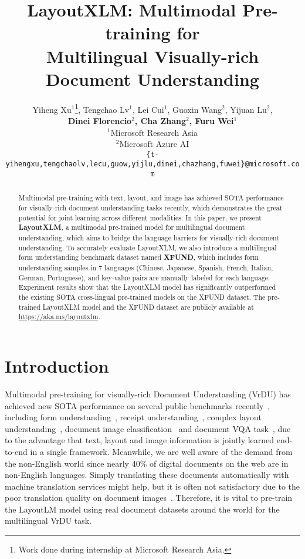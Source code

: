 \documentclass[11pt]{article}
\title{LayoutXLM: Multimodal Pre-training for \\Multilingual Visually-rich Document Understanding}
\author{Yiheng Xu$^{1}$\thanks{Work done during internship at Microsoft Research Asia.}, Tengchao Lv$^{1}$,  Lei Cui$^{1}$, Guoxin Wang$^{2}$, Yijuan Lu$^{2}$, \\ \textbf{Dinei Florencio$^{2}$, Cha Zhang$^{2}$, Furu Wei$^{1}$} \\
$^{1}$Microsoft Research Asia\\
$^{2}$Microsoft Azure AI\\
\texttt{\{t-yihengxu,tengchaolv,lecu,guow,yijlu,dinei,chazhang,fuwei\}@microsoft.com} \\
}
\newcommand{\task}{\textsc{XFUND}\xspace}
\begin{document}
\maketitle
\begin{abstract}


	Multimodal pre-training with text, layout, and image has achieved SOTA performance for visually-rich document understanding tasks recently, which demonstrates the great potential for joint learning across different modalities. In this paper, we present \textbf{LayoutXLM}, a multimodal pre-trained model for multilingual document understanding, which aims to bridge the language barriers for visually-rich document understanding. To accurately evaluate LayoutXLM, we also introduce a multilingual form understanding benchmark dataset named \textbf{\task}, which includes form understanding samples in 7 languages (Chinese, Japanese, Spanish, French, Italian, German, Portuguese), and key-value pairs are manually labeled for each language. Experiment results show that the LayoutXLM model has significantly outperformed the existing SOTA cross-lingual pre-trained models on the \task dataset. The pre-trained LayoutXLM model and the \task dataset are publicly available at \url{https://aka.ms/layoutxlm}.

\end{abstract}

\section{Introduction}


Multimodal pre-training for visually-rich Document Understanding (VrDU) has achieved new SOTA performance on several public benchmarks recently~\citep{xu2020layoutlmv2,10.1145/3394486.3403172}, including form understanding~\citep{Jaume_2019}, receipt understanding~\citep{park2019cord}, complex layout understanding~\citep{graliski2020kleister}, document image classification~\citep{harley2015icdar} and document VQA task~\cite{mathew2020docvqa}, due to the advantage that text, layout and image information is jointly learned end-to-end in a single framework. Meanwhile, we are well aware of the demand from the non-English world since nearly 40\% of digital documents on the web are in non-English languages. Simply translating these documents automatically with machine translation services might help, but it is often not satisfactory due to the poor translation quality on document images~\citep{afli-way-2016-integrating}. Therefore, it is vital to pre-train the LayoutLM model using real document datasets around the world for the multilingual VrDU task.
\end{document}
